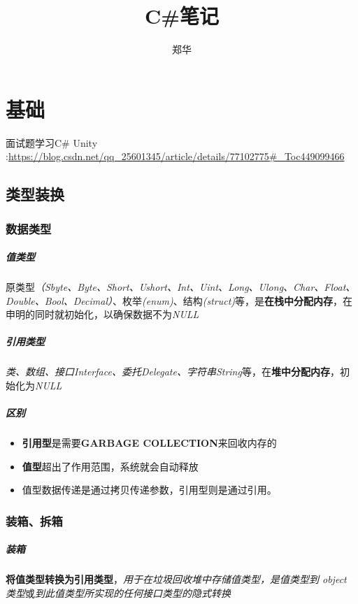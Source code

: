 \documentclass[UTF8,a4paper,12pt]{ctexbook}
\author{\kaishu 郑华}
\title{\heiti C\#笔记}
\begin{document}
 	\maketitle

\chapter{基础}
面试题学习C\# Unity :\url{https://blog.csdn.net/qq_25601345/article/details/77102775#_Toc449099466}
	\section{类型装换}
		\subsection{数据类型}
			\paragraph{值类型}
				原类型\textit{（Sbyte、Byte、Short、Ushort、Int、Uint、Long、Ulong、Char、Float、Double、Bool、Decimal）}、枚举\textit{(enum)}、结构\textit{(struct)}等，是\textbf{在栈中分配内存}，在申明的同时就初始化，以确保数据不为\textit{NULL}
				
			\paragraph{引用类型}
				\textit{类、数组、接口Interface、委托Delegate、字符串String}等，在\textbf{堆中分配内存}，初始化为\textit{NULL}

			\paragraph{区别}
				\begin{itemize}
					\item \textbf{引用型}是需要\textbf{GARBAGE COLLECTION}来回收内存的
					\item \textbf{值型}超出了作用范围，系统就会自动释放
					\item 值型数据传递是通过拷贝传递参数，引用型则是通过引用。
				\end{itemize}
					
		\subsection{装箱、拆箱}
			\paragraph{装箱}
				\textbf{将值类型转换为引用类型}，\textit{用于在垃圾回收堆中存储值类型，是值类型到 object 类型}或\textit{到此值类型所实现的任何接口类型的隐式转换}
				
\end{document}
